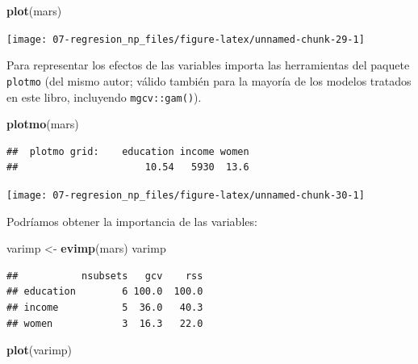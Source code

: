 \documentclass[
  spanish,
]{book}
\newenvironment{Shaded}{\begin{snugshade}}{\end{snugshade}}
\newcommand{\KeywordTok}[1]{\textcolor[rgb]{0.13,0.29,0.53}{\textbf{#1}}}
\newcommand{\NormalTok}[1]{#1}
\newcommand{\StringTok}[1]{\textcolor[rgb]{0.31,0.60,0.02}{#1}}
\theoremstyle{break}
\theoremstyle{definition}
\theoremstyle{definition}
\theoremstyle{definition}
\theoremstyle{remark}
\begin{document}
\begin{Shaded}
\begin{Highlighting}[]
\KeywordTok{plot}\NormalTok{(mars)}
\end{Highlighting}
\end{Shaded}

\begin{center}\texttt{[image: 07-regresion\_np\_files/figure-latex/unnamed-chunk-29-1]} \end{center}

Para representar los efectos de las variables importa las herramientas del paquete \texttt{plotmo} (del mismo autor; válido también para la mayoría de los modelos tratados en este libro, incluyendo \texttt{mgcv::gam()}).

\begin{Shaded}
\begin{Highlighting}[]
\KeywordTok{plotmo}\NormalTok{(mars)}
\end{Highlighting}
\end{Shaded}

\begin{verbatim}
##  plotmo grid:    education income women
##                      10.54   5930  13.6
\end{verbatim}

\begin{center}\texttt{[image: 07-regresion\_np\_files/figure-latex/unnamed-chunk-30-1]} \end{center}

Podríamos obtener la importancia de las variables:

\begin{Shaded}
\begin{Highlighting}[]
\NormalTok{varimp <-}\StringTok{ }\KeywordTok{evimp}\NormalTok{(mars)}
\NormalTok{varimp}
\end{Highlighting}
\end{Shaded}

\begin{verbatim}
##           nsubsets   gcv    rss
## education        6 100.0  100.0
## income           5  36.0   40.3
## women            3  16.3   22.0
\end{verbatim}

\begin{Shaded}
\begin{Highlighting}[]
\KeywordTok{plot}\NormalTok{(varimp)}
\end{Highlighting}
\end{Shaded}
\end{document}
